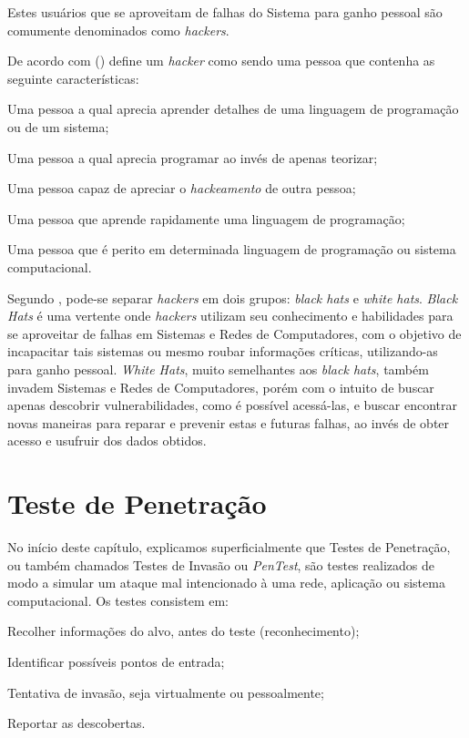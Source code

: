 Estes usuários que se aproveitam de falhas do Sistema para ganho pessoal são comumente denominados como {\em hackers}.

De acordo com  (\citeyear{hackerdictionary}) define um {\em hacker} como sendo uma pessoa que contenha as seguinte características:

\begin{alineas}
  \item Uma pessoa a qual aprecia aprender detalhes de uma linguagem de programação ou de um sistema;
  \item Uma pessoa a qual aprecia programar ao invés de apenas teorizar;
  \item Uma pessoa capaz de apreciar o {\em hackeamento} de outra pessoa;
  \item Uma pessoa que aprende rapidamente uma linguagem de programação;
  \item Uma pessoa que é perito em determinada linguagem de programação ou sistema computacional.
\end{alineas}

Segundo , pode-se separar {\em hackers} em dois grupos: {\em black hats} e {\em white hats}. {\em Black Hats} é uma vertente onde {\em hackers} utilizam seu conhecimento e habilidades para se aproveitar de falhas em Sistemas e Redes de Computadores, com o objetivo de incapacitar tais sistemas ou mesmo roubar informações críticas, utilizando-as para ganho pessoal. {\em White Hats}, muito semelhantes aos {\em black hats}, também invadem Sistemas e Redes de Computadores, porém com o intuito de buscar apenas descobrir vulnerabilidades, como é possível acessá-las, e buscar encontrar novas maneiras para reparar e prevenir estas e futuras falhas, ao invés de obter acesso e usufruir dos dados obtidos.

\section{Teste de Penetração}
\label{s.pentest}

No início deste capítulo, explicamos superficialmente que Testes de Penetração, ou também chamados Testes de Invasão ou {\em PenTest}, são testes realizados de modo a simular um ataque mal intencionado à uma rede, aplicação ou sistema computacional. Os testes consistem em:

\begin{alineas}
  \item Recolher informações do alvo, antes do teste (reconhecimento);
  \item Identificar possíveis pontos de entrada;
  \item Tentativa de invasão, seja virtualmente ou pessoalmente;
  \item Reportar as descobertas.
\end{alineas}

